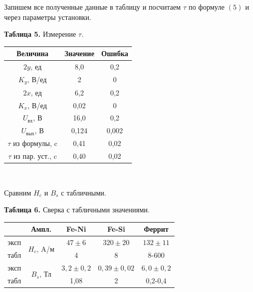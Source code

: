 \documentclass[a4paper, 12pt]{article}%
\begin{document}
Запишем все полученные данные в таблицу и посчитаем $\tau$ по формуле $(5)$ и через параметры установки.
\begin{center}
\textbf{Таблица 5.} Измерение $\tau$.
\begin{tabular}{|c|c|c|}
\hline
Величина & Значение & Ошибка \\ \hline
$2y$, ед & 8,0 & 0,2 \\ \hline
$K_y$, В/ед & 2 & 0 \\ \hline
$2x$, ед & 6,2 & 0,2 \\ \hline
$K_x$, В/ед & 0,02 & 0 \\ \hline
$U_{\text{вх}}$, В & 16,0 & 0,2 \\ \hline
$U_{\text{вых}}$, В & 0,124 & 0,002 \\ \hline
$\tau$ из формулы, c & 0,41 & 0,02 \\ \hline
$\tau$ из пар. уст., c & 0,40 & 0,02 \\ \hline
\end{tabular}\\
\end{center}
\newpage
Сравним $H_c$ и $B_s$ с табличными.
\begin{center}
\textbf{Таблица 6.} Сверка с табличными значениями.
\begin{tabular}{|c|c|c|c|c|}
\hline
 & Ампл. & Fe-Ni & Fe-Si & Феррит \\ \hline
эксп & \multirow{2}{*}{$H_c$, A/м} & $47 \pm 6$ & $320 \pm 20$ & $132 \pm 11$ \\ \cline{1-1} \cline{3-5} 
табл &  & 4 & 8 & 8-600 \\ \hline
эксп & \multirow{2}{*}{$B_s$, Тл} & $3,2 \pm 0,2$ & $0,39 \pm 0,02$ & $6,0 \pm 0,2$ \\ \cline{1-1} \cline{3-5} 
табл &  & 1,08 & 2 & 0,2-0,4 \\ \hline
\end{tabular}\\
\end{center}
\end{document}

